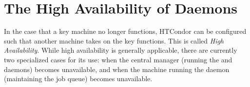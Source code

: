 \section{\label{sec:high-availability}The High Availability of Daemons} 


In the case that a key machine no longer functions,
HTCondor can be configured such that another machine takes on
the key functions.
This is called \emph{High Availability}.
While high availability is generally applicable,
there are currently two specialized cases for its use:
when the central manager 
(running the  and  daemons)
becomes unavailable,
and when the machine running the 
daemon (maintaining the job queue) becomes unavailable.





